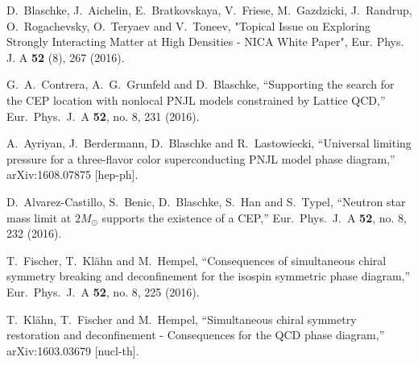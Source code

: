 \documentclass{webofc}
\begin{document}
% 
%
%
\begin{thebibliography}{}
%
%

D.~Blaschke, J.~Aichelin, E.~Bratkovskaya, V.~Friese, M.~Gazdzicki, J.~Randrup, O.~Rogachevsky, 
O.~Teryaev and V.~Toneev, 
"Topical Issue on Exploring Strongly Interacting Matter at High Densities - NICA White Paper", 
Eur. Phys. J. A {\bf 52} (8), 267 (2016). 

  G.~A.~Contrera, A.~G.~Grunfeld and D.~Blaschke,
  ``Supporting the search for the CEP location with nonlocal PNJL models constrained by Lattice QCD,''
  Eur.\ Phys.\ J.\ A {\bf 52}, no. 8, 231 (2016).

  A.~Ayriyan, J.~Berdermann, D.~Blaschke and R.~Lastowiecki,
  ``Universal limiting pressure for a three-flavor color superconducting PNJL model phase diagram,''
  arXiv:1608.07875 [hep-ph].

  D.~Alvarez-Castillo, S.~Benic, D.~Blaschke, S.~Han and S.~Typel,
  ``Neutron star mass limit at $2M_\odot$ supports the existence of a CEP,''
  Eur.\ Phys.\ J.\ A {\bf 52}, no. 8, 232 (2016).

  T.~Fischer, T.~Kl\"ahn and M.~Hempel,
  ``Consequences of simultaneous chiral symmetry breaking and deconfinement for the isospin symmetric phase diagram,''
  Eur.\ Phys.\ J.\ A {\bf 52}, no. 8, 225 (2016).

  T.~Kl\"ahn, T.~Fischer and M.~Hempel,
  ``Simultaneous chiral symmetry restoration and deconfinement - Consequences for the QCD phase diagram,''
  arXiv:1603.03679 [nucl-th].


\end{thebibliography}
\end{document}
